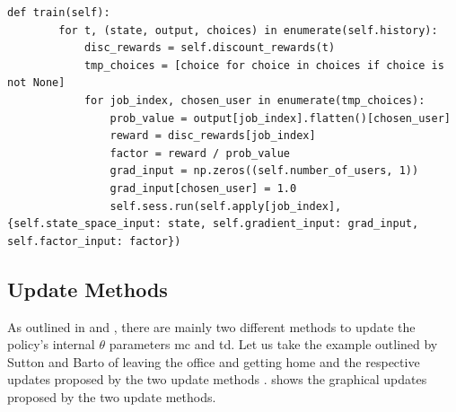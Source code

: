 \documentclass{seal_thesis}
\begin{document}
\begin{lstlisting}[caption=Backpropagation algorithm following a \gls{mc} update approach,label=lst:mc_backpropagation,style=CustomPython]
    def train(self):
        for t, (state, output, choices) in enumerate(self.history):
            disc_rewards = self.discount_rewards(t)
            tmp_choices = [choice for choice in choices if choice is not None]
            for job_index, chosen_user in enumerate(tmp_choices):
                prob_value = output[job_index].flatten()[chosen_user]
                reward = disc_rewards[job_index]
                factor = reward / prob_value
                grad_input = np.zeros((self.number_of_users, 1))
                grad_input[chosen_user] = 1.0
                self.sess.run(self.apply[job_index], {self.state_space_input: state, self.gradient_input: grad_input, self.factor_input: factor})
\end{lstlisting}

\subsection{Update Methods}
\label{subsec:update_methods}

As outlined in  and , there are mainly two different methods to update the policy's internal $\theta$ parameters \ie \gls{mc} and \gls{td}. Let us take the example outlined by Sutton and Barto of leaving the office and getting home and the respective updates proposed by the two update methods \cite[p. 130]{Sutton2017}.  shows the graphical updates proposed by the two update methods.

\end{document}
